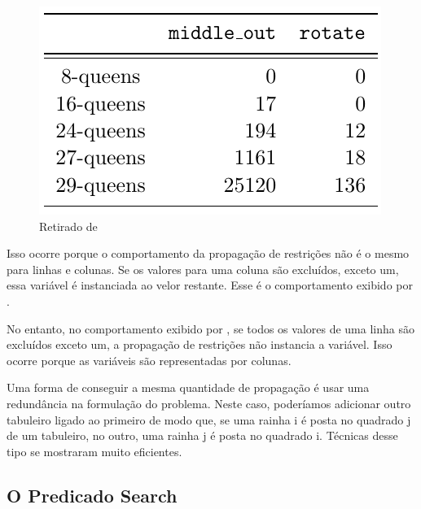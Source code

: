 \documentclass{article}
\begin{document}
\begin{figure}[H]
  \caption{Retirado de \cite{krzysztof}}\label{fig:psi}
  \centering
  \includegraphics[scale=0.4]{rotate.png}
\end{figure}

Isso ocorre porque o comportamento da propagação de restrições não é o mesmo para linhas e colunas.
Se os valores para uma coluna são excluídos, exceto um, essa variável é instanciada ao velor
restante. Esse é o comportamento exibido por .

No entanto, no comportamento exibido por , se todos os valores de uma linha
são excluídos exceto um, a propagação de restrições não instancia a variável. Isso ocorre porque as
variáveis são representadas por colunas.

Uma forma de conseguir a mesma quantidade de propagação é usar uma redundância na formulação do
problema. Neste caso, poderíamos adicionar outro tabuleiro ligado ao primeiro de modo que, se uma
rainha i é posta no quadrado j de um tabuleiro, no outro, uma rainha j é posta no quadrado i.
Técnicas desse tipo se mostraram muito eficientes.

\subsection{O Predicado Search}
\end{document}
